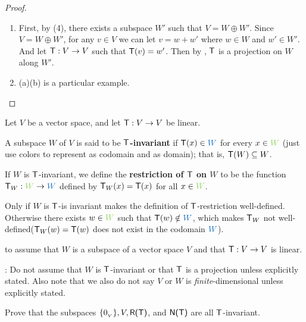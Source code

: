 \begin{proof} \ 
\begin{enumerate}
\item First, by (4), there exists a subspace \(W'\) such that \(V = W \oplus W'\).
Since \(V = W \oplus W'\), for any \(v \in V\) we can let \(v = w + w'\) where \(w \in W\) and \(w' \in W'\).
And let \(\textsf{T} : V \to V\) such that \(\textsf{T}(v) = w'\).
Then by , \(\textsf{T}\) is a projection on \(W\) along \(W'\).

\item {}(a)(b) is a particular example.
\end{enumerate}
\end{proof}

\begin{additional definition} \label{adef 2.3}
Let \(V\) be a vector space, and let \(\textsf{T} : V \to V\) be linear.

 A subspace \(W\) of \(V\) is said to be \textbf{\(\textsf{T}\)-invariant} if \(\T(x) \in \BLUE{W}\) for every \(x \in \GREEN{W}\)
(just use colors to represent \BLUE{\(W\)} as codomain and \GREEN{\(W\)} as domain);
that is, \(\textsf{T}(W) \subseteq W\).

 If \(W\) is \(\textsf{T}\)-invariant, we define the \textbf{restriction of \(\textsf{T}\) on \(W\)} to
be the function \(\T_W : \GREEN{W} \to \BLUE{W}\) defined by \(\textsf{T}_W(x) = \textsf{T}(x)\) for all \(x \in \GREEN{W}\).
\end{additional definition}

\begin{note}
Only if \(W\) is \(\textsf{T}\)-is invariant makes the definition of \(\textsf{T}\)-restriction well-defined.
Otherwise there exists \(w \in \GREEN{W}\) such that \(\T(w) \notin \BLUE{W}\), which makes \(\textsf{T}_W\) not well-defined(\(\textsf{T}_W(w) = \textsf{T}(w)\) does not exist in the codomain \(\BLUE{W}\)).
\end{note}

\begin{note}
 to  assume that \(W\) is a subspace of a vector space \(V\) and that \(\textsf{T} : V \to V\) is linear.

: Do not assume that \(W\) is \(\textsf{T}\)-invariant or that \(\textsf{T}\) is a projection unless explicitly stated.
Also note that we also do not say \(V\) or \(W\) is \emph{finite}-dimensional unless explicitly stated.
\end{note}

\begin{exercise} \label{exercise 2.1.29}
Prove that the subspaces \(\{ 0_{_V} \}, V, \textsf{R(T)}\), and \(\textsf{N(T)}\) are all \(\textsf{T}\)-invariant.
\end{exercise}

